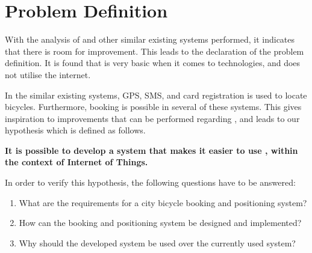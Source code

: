 \section{Problem Definition}
With the analysis of \bycykel and other similar existing systems performed, it indicates that there is room for improvement.
This leads to the declaration of the problem definition.
It is found that \bycykel is very basic when it comes to technologies, and does not utilise the internet.

In the similar existing systems, GPS, SMS, and card registration is used to locate bicycles.
Furthermore, booking is possible in several of these systems.
This gives inspiration to improvements that can be performed regarding \bycykel, and leads to our hypothesis which is defined as follows.

\begin{center}
\textbf{It is possible to develop a system that makes it easier to use \bycykel, within the context of Internet of Things.}
\end{center}

In order to verify this hypothesis, the following questions have to be answered:

\begin{enumerate}
	\item What are the requirements for a city bicycle booking and positioning system?
	\item How can the booking and positioning system be designed and implemented?
	\item Why should the developed system be used over the currently used system?
\end{enumerate}